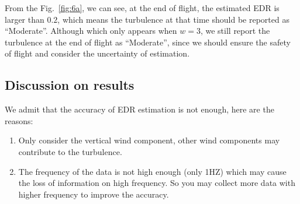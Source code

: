 \documentclass[runningheads]{llncs}
\begin{document}
From the Fig.~\ref{fig:6a}, we can see, at the end of flight, the estimated EDR is larger than $0.2$, 
which means the turbulence at that time should be reported as “Moderate”.
Although which only appears when $w=3$, we still report the turbulence at the end of flight as “Moderate”, since we should ensure the safety of flight and consider the uncertainty of estimation.

\subsection{Discussion on results}

We admit that the accuracy of EDR estimation is not enough, here are the reasons:

\begin{enumerate}
    \item Only consider the vertical wind component, other wind components may contribute to the turbulence.
    \item The frequency of the data is not high enough (only 1HZ) which may cause the loss of information on high frequency. So you may collect more data with higher frequency to improve the accuracy.
\end{enumerate}






\end{document}
